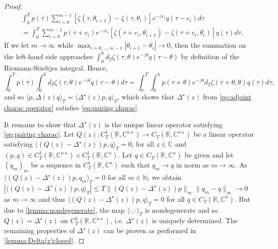 \documentclass[english]{myarticle}
\begin{document}
\begin{sloppypar}
\begin{proof}
\begin{align*}
&\int_0^T p(\tau) \sum_{i=0}^{m-1} [ \zeta(\tau,\theta_{i+1}) - \zeta(\tau,\theta_i)] e^{-z c_i}q(\tau - c_i)  d\tau \\
&= \int_0^T \sum_{i=0}^{m-1} p(\tau+c_i) e^{-z c_i}[ \zeta(\tau + c_i,\theta_{i+1}) - \zeta(\tau + c_i,\theta_i)] q(\tau) d\tau.  
\end{align*}
If we let $m \to \infty$ while $\max_{i=0,\dots,m-1} |\theta_{i+1} - \theta_i| \to 0$, then the summation on the left-hand side approaches $\int_0^h d_2 \zeta(\tau,\theta) e^{-z\theta}q(\tau-\theta)$ by definition of the Riemann-Stieltjes integral. Hence,
\begin{equation*}
\int_0^T p(\tau) \int_0^h d_2 \zeta(\tau,\theta) e^{-z\theta}q(\tau-\theta) d\tau = \int_0^T \int_0^h p(\tau + \theta) e^{-z\theta}  d_2\zeta(\tau+\theta,\theta)q(\tau) d\tau,
\end{equation*}
and so $\langle p,\Delta(z)q \rangle_T = \langle \Delta^\star(z)p, q \rangle_T$, which shows that $\Delta^\star(z)$ from \eqref{eq:adjoint charac operator} satisfies \eqref{eq:pairing charac}. 

It remains to show that $\Delta^{\star}(z)$ is the unique linear operator satisfying \eqref{eq:pairing charac}. Let $Q(z) : C_T^1(\mathbb{R},\mathbb{C}^{n \star}) \to C_T(\mathbb{R},\mathbb{C}^{n \star})$ be a linear operator satisfying $\langle (Q(z) - \Delta^\star(z))p,q \rangle_T = 0$, for all $z \in \mathbb{C}$ and $ (p,q) \in C_T^1(\mathbb{R},\mathbb{C}^{n \star}) \times  C_T^1(\mathbb{R},\mathbb{C}^n)$. Let $q \in C_T(\mathbb{R},\mathbb{C}^n)$ be given and let $(q_m)_m$ be a sequence in $C_T^1(\mathbb{R},\mathbb{C}^n)$ such that $q_m \to q$ in norm as $m \to \infty$. As $\langle (Q(z) - \Delta^\star(z))p,q_m \rangle_T = 0$ for all $m \in \mathbb{N}$, we obtain $|\langle (Q(z) - \Delta^\star(z))p,q \rangle_T| \leq T \| (Q(z) - \Delta^\star(z))p \|_\infty \| q_m - q \|_\infty \to 0$ as $m \to \infty$ and thus $\langle (Q(z) - \Delta^\star(z))p,q \rangle_T = 0$ for all $q \in C_T(\mathbb{R},\mathbb{C}^n)$. But due to \cref{lemma:nondegenerate}, the map $\langle \cdot , \cdot \rangle_T$ is nondegenerate and so $Q(z) = \Delta^\star(z)$ on $C_T^1(\mathbb{R},\mathbb{C}^{n \star})$, i.e. $\Delta^\star(z)$ is uniquely determined. The remaining properties of $\Delta^\star(z)$ can be proven as performed in \cref{lemma:Delta(z)closed}.
\end{proof}


\end{sloppypar}
\end{document}
